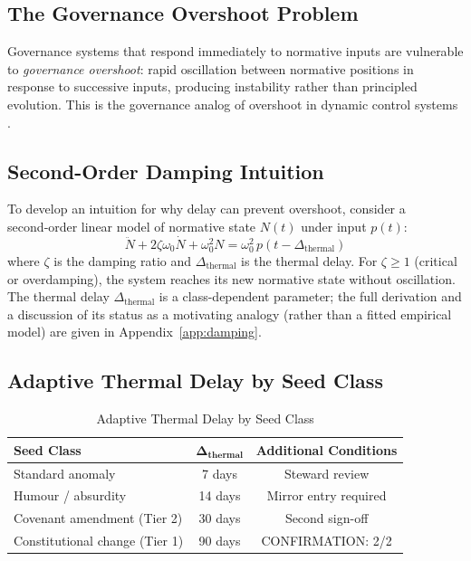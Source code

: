 \documentclass[12pt,a4paper]{article}
\theoremstyle{definition}
\theoremstyle{remark}
\begin{document}
\subsection{The Governance Overshoot Problem}

Governance systems that respond immediately to normative inputs are vulnerable to
\emph{governance overshoot}: rapid oscillation between normative positions in response
to successive inputs, producing instability rather than principled evolution. This is
the governance analog of overshoot in dynamic control systems \cite{astrom2021}.

\subsection{Second-Order Damping Intuition}

To develop an intuition for why delay can prevent overshoot, consider a second‑order
linear model of normative state $N(t)$ under input $p(t)$:
\begin{equation}
  \ddot{N} + 2\zeta\omega_0 \dot{N} + \omega_0^2 N = \omega_0^2 \, p(t - \Delta_\text{thermal})
  \label{eq:damped}
\end{equation}
where $\zeta$ is the damping ratio and $\Delta_\text{thermal}$ is the thermal delay.
For $\zeta \geq 1$ (critical or overdamping), the system reaches its new normative
state without oscillation. The thermal delay $\Delta_\text{thermal}$ is a
class-dependent parameter; the full derivation and a discussion of its status as a
motivating analogy (rather than a fitted empirical model) are given in
Appendix~\ref{app:damping}.

\subsection{Adaptive Thermal Delay by Seed Class}

\begin{table}[h]
\centering
\caption{Adaptive Thermal Delay by Seed Class}
\label{tab:delay}
\begin{tabular}{lcc}
\toprule
\textbf{Seed Class} & $\boldsymbol{\Delta_\text{thermal}}$ & \textbf{Additional Conditions} \\
\midrule
Standard anomaly & 7 days & Steward review \\
Humour / absurdity & 14 days & Mirror entry required \\
Covenant amendment (Tier 2) & 30 days & Second sign-off \\
Constitutional change (Tier 1) & 90 days & CONFIRMATION: 2/2 \\
\bottomrule
\end{tabular}
\end{table}
\end{document}
